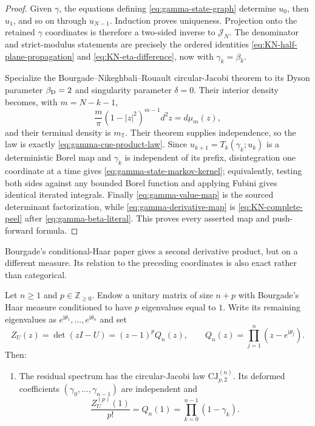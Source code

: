 \begin{sloppypar}
\begin{proof}
Given $\gamma$, the equations defining \eqref{eq:gamma-state-graph} determine $u_0$,
then $u_1$, and so on through $u_{N-1}$.  Induction proves uniqueness.  Projection
onto the retained $\gamma$ coordinates is therefore a two-sided inverse to
$\mathcal J_N$.  The denominator and strict-modulus statements are precisely the
ordered identities \eqref{eq:KN-half-plane-propagation} and
\eqref{eq:KN-eta-difference}, now with $\gamma_k=\beta_k$.

Specialize the Bourgade--Nikeghbali--Rouault circular-Jacobi theorem to its Dyson
parameter $\beta_{\rm D}=2$ and singularity parameter $\delta=0$.  Their interior
density becomes, with $m=N-k-1$,
\begin{equation}
 \frac{m}{\pi}(1-|z|^2)^{m-1}d^2z=d\mu_m(z),
\end{equation}
and their terminal density is $m_{\mathbb T}$.  Their theorem supplies independence,
so the law is exactly \eqref{eq:gamma-cue-product-law}.  Since
$u_{k+1}=T_k(\gamma_k;u_k)$ is a deterministic Borel map and $\gamma_k$ is independent
of its prefix, disintegration one coordinate at a time gives
\eqref{eq:gamma-state-markov-kernel}; equivalently, testing both sides against any
bounded Borel function and applying Fubini gives identical iterated integrals.
Finally \eqref{eq:gamma-value-map} is the sourced determinant factorization, while
\eqref{eq:gamma-derivative-map} is
\eqref{eq:KN-complete-peel} after \eqref{eq:gamma-beta-literal}.  This proves every
asserted map and push-forward formula.
\end{proof}

Bourgade's conditional-Haar paper gives a second derivative product, but on a
different measure.  Its relation to the preceding coordinates is also exact rather
than categorical.

\begin{proposition}
\label{prop:conditional-haar-gamma-crosswalk}
Let $n\geq1$ and $p\in\mathbb Z_{\geq0}$.  Endow a unitary matrix of size $n+p$
with Bourgade's Haar measure conditioned to have $p$ eigenvalues equal to $1$.
Write its remaining eigenvalues as $e^{\mathrm i\theta_1},\ldots,e^{\mathrm i\theta_n}$
and set
\begin{equation}
 Z_U(z)=\det(zI-U)=(z-1)^p Q_n(z),
 \qquad
 Q_n(z)=\prod_{j=1}^{n}(z-e^{\mathrm i\theta_j}).
 \label{eq:conditional-residual-polynomial}
\end{equation}
Then:
\begin{enumerate}
 \item The residual spectrum has the circular-Jacobi law
 $\mathrm{CJ}^{(n)}_{p,2}$.  Its deformed coefficients
 $(\gamma_0,\ldots,\gamma_{n-1})$ are independent and
 \begin{equation}
  \frac{Z_U^{(p)}(1)}{p!}=Q_n(1)
  =\prod_{k=0}^{n-1}(1-\gamma_k).
  \label{eq:conditional-derivative-gamma-product}
 \end{equation}


\end{enumerate}
\end{proposition}
\end{sloppypar}
